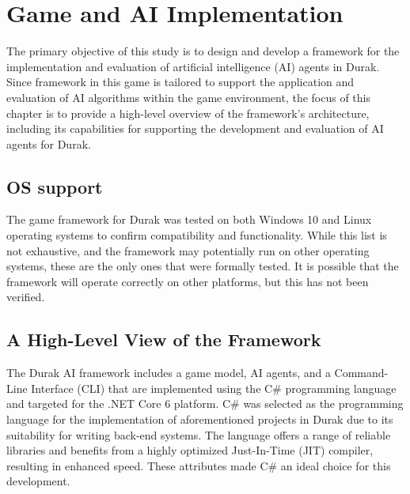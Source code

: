 \chapter{Game and AI Implementation}

The primary objective of this study is to design and develop a framework for the implementation and evaluation of artificial intelligence (AI) agents in Durak. Since framework in this game is tailored to support the application and evaluation of AI algorithms within the game environment, the focus of this chapter is to provide a high-level overview of the framework's architecture, including its capabilities for supporting the development and evaluation of AI agents for Durak.


\section{OS support}

The game framework for Durak was tested on both Windows 10 and Linux operating systems to confirm compatibility and functionality. While this list is not exhaustive, and the framework may potentially run on other operating systems, these are the only ones that were formally tested. It is possible that the framework will operate correctly on other platforms, but this has not been verified.

\section{A High-Level View of the Framework}

The Durak AI framework includes a game model, AI agents, and a Command-Line Interface (CLI) that are implemented using the C\# programming language and targeted for the .NET Core 6 platform. C\# was selected as the programming language for the implementation of aforementioned projects in Durak due to its suitability for writing back-end systems. The language offers a range of reliable libraries and benefits from a highly optimized Just-In-Time (JIT) compiler, resulting in enhanced speed. These attributes made C\# an ideal choice for this development.

